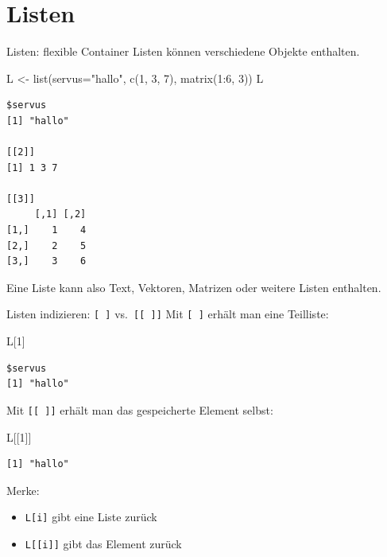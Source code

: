 \documentclass[
  10pt,
  ignorenonframetext,
  aspectratio=169,
]{beamer}
\newenvironment{Shaded}{}{}
\newcommand{\AttributeTok}[1]{\textcolor[rgb]{0.49,0.56,0.16}{#1}}
\newcommand{\DecValTok}[1]{\textcolor[rgb]{0.25,0.63,0.44}{#1}}
\newcommand{\FunctionTok}[1]{\textcolor[rgb]{0.02,0.16,0.49}{#1}}
\newcommand{\NormalTok}[1]{#1}
\newcommand{\OtherTok}[1]{\textcolor[rgb]{0.00,0.44,0.13}{#1}}
\newcommand{\SpecialCharTok}[1]{\textcolor[rgb]{0.25,0.44,0.63}{#1}}
\newcommand{\StringTok}[1]{\textcolor[rgb]{0.25,0.44,0.63}{#1}}
\providecommand{\tightlist}{%
  \setlength{\itemsep}{0pt}\setlength{\parskip}{0pt}}
\begin{document}
\section{Listen}\label{listen}

\begin{frame}[fragile]{Listen: flexible Container}
\label{listen-flexible-container}
Listen können verschiedene Objekte enthalten.

\begin{Shaded}
\begin{Highlighting}[]
\NormalTok{L }\OtherTok{\textless{}{-}} \FunctionTok{list}\NormalTok{(}\AttributeTok{servus=}\StringTok{"hallo"}\NormalTok{, }\FunctionTok{c}\NormalTok{(}\DecValTok{1}\NormalTok{, }\DecValTok{3}\NormalTok{, }\DecValTok{7}\NormalTok{), }\FunctionTok{matrix}\NormalTok{(}\DecValTok{1}\SpecialCharTok{:}\DecValTok{6}\NormalTok{, }\DecValTok{3}\NormalTok{))}
\NormalTok{L}
\end{Highlighting}
\end{Shaded}

\begin{verbatim}
$servus
[1] "hallo"

[[2]]
[1] 1 3 7

[[3]]
     [,1] [,2]
[1,]    1    4
[2,]    2    5
[3,]    3    6
\end{verbatim}

Eine Liste kann also Text, Vektoren, Matrizen oder weitere Listen
enthalten.
\end{frame}

\begin{frame}[fragile]{Listen indizieren: \texttt{{[}\ {]}}
vs.~\texttt{{[}{[}\ {]}{]}}}
\label{listen-indizieren-vs.}
Mit \texttt{{[}\ {]}} erhält man eine Teilliste:

\begin{Shaded}
\begin{Highlighting}[]
\NormalTok{L[}\DecValTok{1}\NormalTok{]}
\end{Highlighting}
\end{Shaded}

\begin{verbatim}
$servus
[1] "hallo"
\end{verbatim}

Mit \texttt{{[}{[}\ {]}{]}} erhält man das gespeicherte Element selbst:

\begin{Shaded}
\begin{Highlighting}[]
\NormalTok{L[[}\DecValTok{1}\NormalTok{]]}
\end{Highlighting}
\end{Shaded}

\begin{verbatim}
[1] "hallo"
\end{verbatim}

Merke:

\begin{itemize}
\tightlist
\item
  \texttt{L{[}i{]}} gibt eine Liste zurück
\item
  \texttt{L{[}{[}i{]}{]}} gibt das Element zurück
\end{itemize}
\end{frame}
\end{document}
